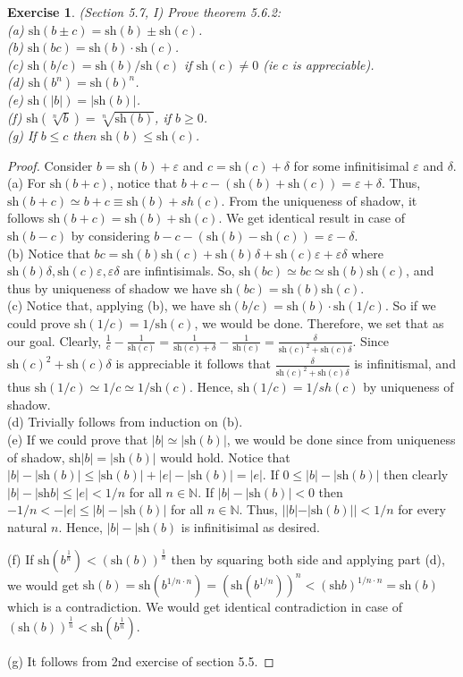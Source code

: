 \documentclass[a4paper, 11pt, openany]{book}
\theoremstyle{plain}
\newtheorem{exercise}{Exercise}[chapter]
\theoremstyle{plain}
\newcommand{\N}{\mathbb{N}}
\newcommand{\ep}{\varepsilon}
\newcommand{\del}{\delta}
\newcommand{\sh}{\text{sh}}
\begin{document}
  \begin{exercise}
    (Section 5.7, I)
    Prove theorem 5.6.2: \\
    (a) $\sh (b\pm c) = \sh (b) \pm \sh (c)$. \\
    (b) $\sh(bc)=\sh(b)\cdot \sh(c)$. \\
    (c) $\sh(b/c)=\sh(b)/\sh(c)$ if $\sh(c) \not = 0$ (ie $c$ is appreciable).\\ 
    (d) $\sh(b^n)=\sh(b)^n$. \\
    (e) $\sh (|b|)=|\sh (b)|$.\\
    (f) $\sh(\sqrt[n]{b})=\sqrt[n]{\sh(b)}$, if $b \geq 0$. \\
    (g) If $b \leq c$ then $\sh(b) \leq \sh(c)$.
  \end{exercise}
  \begin{proof} Consider $b=\sh(b)+\ep$ and $c=\sh(c)+\del$ for some infinitisimal $\ep$ and $\del$. \\
    (a) For $\sh(b+c)$, notice that $b+c-(\sh(b)+\sh(c))=\ep+\del$. Thus, $\sh(b+c) \simeq b+c \equiv \sh(b)+sh(c)$. From the uniqueness of shadow, it follows $\sh(b+c)=\sh(b)+\sh(c)$. We get identical result in case of $\sh(b-c)$ by considering $b-c-(\sh(b)-\sh(c))=\ep-\del$. \\

    (b) Notice that $bc=\sh(b)\sh(c)+\sh(b) \del +\sh(c)\ep +\ep\del$ where $\sh(b) \del, \sh(c)\ep, \ep\del$ are infintisimals. So, $\sh(bc) \simeq bc \simeq \sh(b)\sh(c)$, and thus by uniqueness of shadow we have $\sh(bc)=\sh(b)\sh(c)$.\\

    (c) Notice that, applying (b), we have $\sh(b/c)=\sh(b) \cdot \sh(1/c)$. So if we could prove $\sh(1/c)=1/\sh(c)$, we would be done. Therefore, we set that as our goal. Clearly, $\frac{1}{c}-\frac{1}{\sh(c)}=\frac{1}{\sh(c)+\del}-\frac{1}{\sh(c)}=\frac{\del}{\sh(c)^2+\sh(c)\del}$. Since $\sh(c)^2+\sh(c)\del$ is appreciable it follows that $\frac{\del}{\sh(c)^2+\sh(c)\del}$ is infinitismal, and thus $\sh(1/c) \simeq 1/c \simeq 1/\sh(c)$. Hence, $\sh(1/c)=1/sh(c)$ by uniqueness of shadow. \\

    (d) Trivially follows from induction on (b). \\

    (e) If we could prove that $|b|\simeq |\sh (b)|$, we would be done since from uniqueness of shadow, $\sh |b|=|\sh (b)|$ would hold. Notice that $|b|-|\sh (b)| \leq |\sh (b)|+|e|-|\sh (b)|=|e|$. If $0 \leq |b|-|\sh (b)|$ then clearly $|b|-|\sh b| \leq |e|<1/n$ for all $n \in \N$. If $|b|-|\sh (b)|<0$ then $-1/n<-|e| \leq |b|-|\sh(b)|$ for all $n \in \N$. Thus, $||b|-|\sh (b)||<1/n$ for every natural $n$. Hence, $|b|-|\sh(b)$ is infinitisimal as desired. 

    (f) If $\sh(b^\frac{1}{n})<(\sh (b))^\frac{1}{n}$ then by squaring both side and applying part (d), we would get $\sh (b)=\sh(b^{1/n \cdot n})=(\sh (b^{1/n}))^n<(\sh b)^{1/n \cdot n}=\sh(b)$ which is a contradiction. We would get identical contradiction in case of $(\sh (b))^\frac{1}{n}<\sh(b^\frac{1}{n})$. 

    (g) It follows from 2nd exercise of section 5.5.
  \end{proof}
\end{document}
